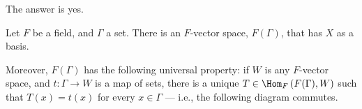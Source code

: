 \documentclass[10pt]{mypackage}
\begin{document}
The answer is yes.
\begin{theorem}
  Let $F$ be a field, and $\Gamma$ a set. There is an $F$-vector space, $F\left(\Gamma\right)$, that has $X$ as a basis.\newline

  Moreover, $F\left(\Gamma\right)$ has the following universal property: if $W$ is any $F$-vector space, and $t: \Gamma\rightarrow W$ is a map of sets, there is a unique $T\in \Hom_{F}\left(F(\Gamma),W\right)$ such that $T(x) = t(x)$ for every $x\in \Gamma$ --- i.e., the following diagram commutes.
  \begin{center}
  \end{center}
\end{theorem}
\end{document}
